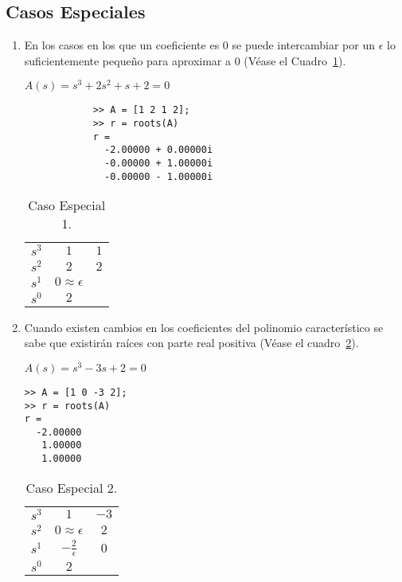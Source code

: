     \subsection{Casos Especiales}
        \begin{enumerate}

            \item En los casos en los que un coeficiente es $0$ se puede intercambiar por un $\epsilon$ lo suficientemente pequeño para aproximar a $0$ (Véase el Cuadro~\ref{tab:Caso1}).

            \begin{math}
            A(s) = s^3 + 2 s^2 + s + 2 = 0
            \end{math}

            \begin{verbatim}
            >> A = [1 2 1 2];
            >> r = roots(A)
            r =
              -2.00000 + 0.00000i
              -0.00000 + 1.00000i
              -0.00000 - 1.00000i
            \end{verbatim}

            \begin{table}[htbp]
                \centering
                \begin{tabular}{c|c c}
                $s^3$ & $1$ & $1$ \\
                $s^2$ & $2$ & $2$ \\
                $s^1$ & $0 \approx \epsilon$ \\
                $s^0$ & $2$
                \end{tabular}
            \caption{\label{tab:Caso1}Caso Especial 1.}
            \end{table}

            \item Cuando existen cambios en los coeficientes del polinomio característico se sabe que existirán raíces con parte real positiva (Véase el cuadro~\ref{tab:Caso2}).

\begin{math}
A(s) = s^3 - 3 s + 2 = 0
\end{math}

\begin{verbatim}
>> A = [1 0 -3 2];
>> r = roots(A)
r =
  -2.00000
   1.00000
   1.00000
\end{verbatim}

\begin{table}[htbp]
\centering
\begin{tabular}{c|c c}
$s^3$ & $1$ & $-3$ \\
$s^2$ & $0\approx\epsilon$ & $2$ \\
$s^1$ & $-\frac{2}{\epsilon}$ & $0$ \\
$s^0$ & $2$
\end{tabular}
\caption{\label{tab:Caso2}Caso Especial 2.}
\end{table}


\end{enumerate}

